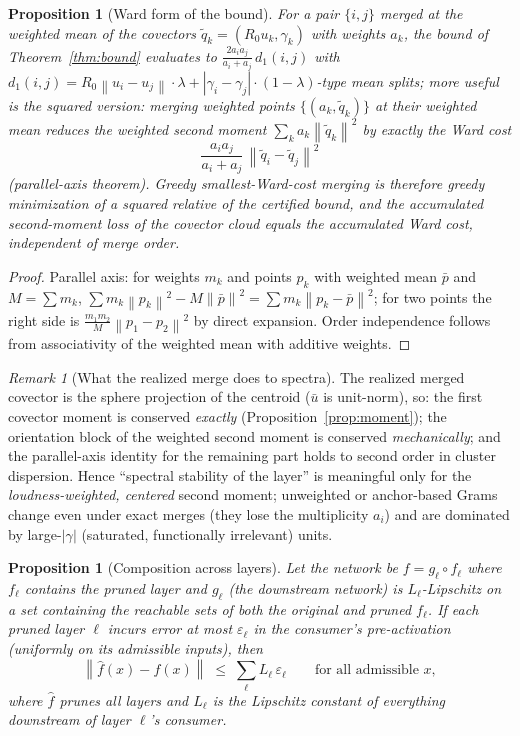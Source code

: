 \documentclass[11pt]{article}
\newtheorem{proposition}[theorem]{Proposition}
\theoremstyle{remark}
\newtheorem{remark}[theorem]{Remark}
\newcommand{\norm}[1]{\left\lVert #1 \right\rVert}
\newcommand{\abs}[1]{\left\lvert #1 \right\rvert}
\begin{document}
\begin{proposition}[Ward form of the bound]\label{prop:ward}
For a pair $\{i,j\}$ merged at the weighted mean of the covectors
$\tilde q_k = (R_0 u_k, \gamma_k)$ with weights $a_k$, the bound of
Theorem~\ref{thm:bound} evaluates to
$\tfrac{2 a_i a_j}{a_i + a_j}\,d_1(i,j)$ with
$d_1(i,j) = R_0\norm{u_i - u_j}\cdot\lambda + \abs{\gamma_i-\gamma_j}\cdot
(1-\lambda)$-type mean splits; more useful is the squared version: merging
weighted points $\{(a_k, \tilde q_k)\}$ at their weighted mean reduces the
weighted second moment $\sum_k a_k \norm{\tilde q_k}^2$ by exactly the
\emph{Ward cost}
\[
  \frac{a_i a_j}{a_i + a_j}\, \norm{\tilde q_i - \tilde q_j}^2
\]
(parallel-axis theorem). Greedy smallest-Ward-cost merging is therefore
greedy minimization of a squared relative of the certified bound, and the
accumulated second-moment loss of the covector cloud equals the accumulated
Ward cost, independent of merge order.
\end{proposition}

\begin{proof}
Parallel axis: for weights $m_k$ and points $p_k$ with weighted mean
$\bar p$ and $M=\sum m_k$,
$\sum m_k\norm{p_k}^2 - M\norm{\bar p}^2 = \sum m_k \norm{p_k - \bar p}^2$;
for two points the right side is
$\tfrac{m_1 m_2}{M}\norm{p_1 - p_2}^2$ by direct expansion. Order
independence follows from associativity of the weighted mean with additive
weights.
\end{proof}

\begin{remark}[What the realized merge does to spectra]\label{rem:spectra}
The realized merged covector is the sphere projection of the centroid
($\bar u$ is unit-norm), so: the first covector moment is conserved
\emph{exactly} (Proposition~\ref{prop:moment}); the orientation block of the
weighted second moment is conserved \emph{mechanically}; and the
parallel-axis identity for the remaining part holds to second order in
cluster dispersion. Hence ``spectral stability of the layer'' is meaningful
only for the \emph{loudness-weighted, centered} second moment; unweighted or
anchor-based Grams change even under exact merges (they lose the multiplicity
$a_i$) and are dominated by large-$\abs\gamma$ (saturated, functionally
irrelevant) units.
\end{remark}

\begin{proposition}[Composition across layers]\label{prop:compose}
Let the network be $f = g_\ell \circ f_\ell$ where $f_\ell$ contains the
pruned layer and $g_\ell$ (the downstream network) is $L_\ell$-Lipschitz on a
set containing the reachable sets of both the original and pruned $f_\ell$.
If each pruned layer $\ell$ incurs error at most $\varepsilon_\ell$ in the
consumer's pre-activation (uniformly on its admissible inputs), then
\[
  \norm{\hat f(x) - f(x)} \;\le\; \sum_{\ell} L_\ell\, \varepsilon_\ell
  \qquad \text{for all admissible } x,
\]
where $\hat f$ prunes all layers and $L_\ell$ is the Lipschitz constant of
everything downstream of layer $\ell$'s consumer.
\end{proposition}
\end{document}
